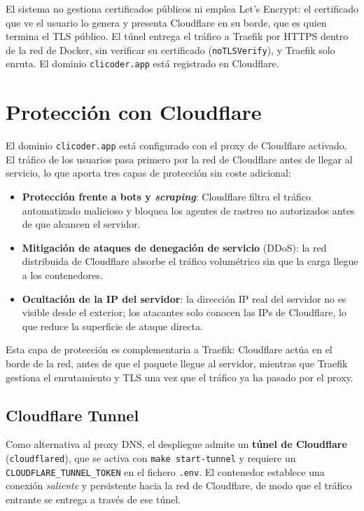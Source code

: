 El sistema no gestiona certificados públicos ni emplea Let's Encrypt: el certificado que ve el usuario lo genera y presenta Cloudflare en su borde, que es quien termina el TLS público. El túnel entrega el tráfico a Traefik por HTTPS dentro de la red de Docker, sin verificar su certificado (\texttt{noTLSVerify}), y Traefik solo enruta. El dominio \texttt{clicoder.app} está registrado en Cloudflare.

\Needspace{0.7\textheight}
\section{Protección con Cloudflare}

El dominio \texttt{clicoder.app} está configurado con el proxy de Cloudflare activado. El tráfico de los usuarios pasa primero por la red de Cloudflare antes de llegar al servicio, lo que aporta tres capas de protección sin coste adicional:

\begin{itemize}
    \item \textbf{Protección frente a bots y \emph{scraping}}: Cloudflare filtra el tráfico automatizado malicioso y bloquea los agentes de rastreo no autorizados antes de que alcancen el servidor.
    \item \textbf{Mitigación de ataques de denegación de servicio} (DDoS): la red distribuida de Cloudflare absorbe el tráfico volumétrico sin que la carga llegue a los contenedores.
    \item \textbf{Ocultación de la IP del servidor}: la dirección IP real del servidor no es visible desde el exterior; los atacantes solo conocen las IPs de Cloudflare, lo que reduce la superficie de ataque directa.
\end{itemize}

Esta capa de protección es complementaria a Traefik: Cloudflare actúa en el borde de la red, antes de que el paquete llegue al servidor, mientras que Traefik gestiona el enrutamiento y TLS una vez que el tráfico ya ha pasado por el proxy.

\subsection{Cloudflare Tunnel}

Como alternativa al proxy DNS, el despliegue admite un \textbf{túnel de Cloudflare} (\texttt{cloudflared}), que se activa con \texttt{make start-tunnel} y requiere un \texttt{CLOUDFLARE\_TUNNEL\_TOKEN} en el fichero \texttt{.env}. El contenedor establece una conexión \emph{saliente} y persistente hacia la red de Cloudflare, de modo que el tráfico entrante se entrega a través de ese túnel.

